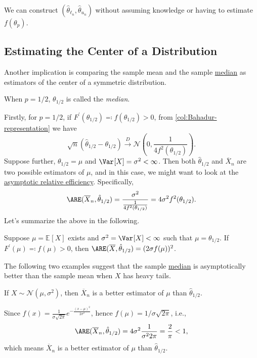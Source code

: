 \begin{remark}
	We can construct \((\hat{\theta} _{\ell _n}, \hat{\theta} _{u_n})\) without assuming knowledge or having to estimate \(f(\theta _p)\).
\end{remark}

\subsection{Estimating the Center of a Distribution}
Another implication is comparing the sample mean and the sample \hyperref[def:median]{median} as estimators of the center of a symmetric distribution.

\begin{definition}[Median]\label{def:median}
	When \(p = 1 / 2\), \(\theta _{1 / 2}\) is called the \emph{median}.
\end{definition}

Firstly, for \(p = 1 / 2\), if \(F^{\prime} (\theta _{1 / 2}) \eqqcolon f(\theta _{1 / 2}) > 0\), from \autoref{col:Bahadur-representation} we have
\[
	\sqrt{n} (\hat{\theta} _{1 / 2} - \theta _{1 / 2})
	\overset{D}{\to} \mathcal{N} \left( 0, \frac{1}{4 f^2(\theta _{1 / 2})} \right) .
\]
Suppose further, \(\theta _{1 / 2} = \mu \) and \(\Var_{}[X] = \sigma ^2 < \infty \). Then both \(\hat{\theta} _{1 / 2}\) and \(\overline{X} _n\) are two possible estimators of \(\mu \), and in this case, we might want to look at the \hyperref[def:asymptotic-relative-efficiency-estimator]{asymptotic relative efficiency}. Specifically,
\[
	\ARE(\overline{X} _n , \hat{\theta} _{1 / 2})
	= \frac{\sigma ^2}{\frac{1}{4 f^2(\theta _{1 / 2})}}
	= 4 \sigma ^2 f^2(\theta _{1 / 2}).
\]
Let's summarize the above in the following.

\begin{proposition}\label{prop:sample-quantile-ARE}
	Suppose \(\mu = \mathbb{E}_{}[X] \) exists and \(\sigma ^2 = \Var_{}[X] < \infty \) such that \(\mu = \theta _{1 / 2}\). If \(F^{\prime} (\mu ) \eqqcolon f(\mu ) > 0\), then \(\ARE(\overline{X} , \hat{\theta} _{1 / 2}) = (2 \sigma f(\mu ))^2\).
\end{proposition}

The following two examples suggest that the sample \hyperref[def:median]{median} is asymptotically better than the sample mean when \(X\) has heavy tails.

\begin{eg}\label{eg:ARE-normal}
	If \(X \sim \mathcal{N} (\mu , \sigma ^2)\), then \(\overline{X} _n\) is a better estimator of \(\mu \) than \(\hat{\theta} _{1 / 2}\).
\end{eg}
\begin{explanation}
	Since \(f(x) = \frac{1}{\sigma \sqrt{2\pi } } e^{- \frac{(x - \mu )^2}{2 \sigma ^2}}\), hence \(f(\mu ) = 1 / \sigma \sqrt{2\pi } \), i.e.,
	\[
		\ARE(\overline{X} _n, \hat{\theta} _{1 / 2})
		= 4 \sigma ^2 \frac{1}{\sigma ^2 2\pi }
		= \frac{2}{\pi }
		< 1,
	\]
	which means \(\overline{X} _n\) is a better estimator of \(\mu \) than \(\hat{\theta} _{1 / 2}\).
\end{explanation}

